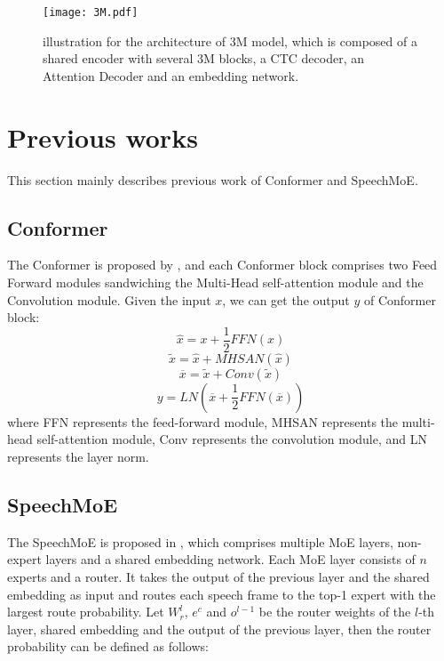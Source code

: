 \documentclass[a4paper]{article}
\begin{document}
\label{sec:typestyle}
\begin{figure*}[!tb]
\begin{minipage}[b]{0.9\linewidth}
  \centering
  \centerline{\texttt{[image: 3M.pdf]}}
\end{minipage}
\caption{
illustration for the architecture of 3M model, which is composed of a shared encoder with several 3M blocks, a CTC decoder, an Attention Decoder and an embedding network.
}
\end{figure*}

\section{Previous works}

This section mainly describes previous work of Conformer and SpeechMoE.
\subsection{Conformer}
The Conformer is proposed by \cite{conformer}, and each Conformer block comprises two Feed Forward modules sandwiching the Multi-Head self-attention module and the Convolution module. Given the input $x$, we can get the output $y$ of Conformer block:
\begin{equation}
\hat{x}= x + \frac{1}{2}FFN(x)
\end{equation}
\begin{equation}
\widetilde{x}= \hat{x} + MHSAN(\hat{x})
\end{equation}
\begin{equation}
\overline{x}= \widetilde{x} + Conv(\widetilde{x})
\end{equation}
\begin{equation}
y= LN(\overline{x} + \frac{1}{2}FFN(\overline{x}))
\end{equation}
where FFN represents the feed-forward module, MHSAN represents the multi-head self-attention module, Conv represents the convolution module, and LN represents the layer norm.
\subsection{SpeechMoE}
The SpeechMoE is proposed in \cite{you2021speechmoe}, which comprises multiple MoE layers, non-expert layers and a shared embedding network. Each MoE layer consists of $n$ experts and a router. It takes the output of the previous layer
and the shared embedding as input and routes each speech frame to the top-1 expert with the largest route probability. Let $W^{l}_{r}$, $e^{c}$ and $o^{l-1}$ be the router weights of the $l$-th layer, shared embedding and the output of the previous layer, then the router probability can be defined as follows:
\end{document}
